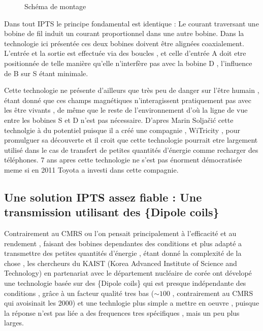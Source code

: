 \documentclass[12pt]{report}
\begin{document}
\begin{figure}
  \begin{center}
    \setlength\fboxsep{0pt}
    \setlength\fboxrule{0.5pt}
  \end{center}
  \caption{Schéma de montage}
\end{figure} Dans tout IPTS le principe fondamental est identique : Le courant traversant une bobine de fil induit un courant proportionnel dans une autre bobine. Dans la technologie ici présentée ces deux bobines doivent être alignées coaxialement. L'entrée et la sortie est effectuée via des boucles , et celle d'entrée A doit etre positionnée de telle manière qu'elle n'interfère pas avec la bobine D , l'influence de B sur S étant minimale.

  Cette technologie ne présente d'ailleurs que très peu de danger \cite{wiki1} sur l'être humain , étant donné que ces champs magnétiques n'interagissent pratiquement pas avec les être vivants , de même que le reste de l'environnement d'où la ligne de vue entre les bobines S et D n'est pas nécessaire.
 D'apres Marin Soljačić cette technolgie à du potentiel puisque il a créé une compagnie , WiTricity , pour promulguer sa découverte et il croit que cette technologie pourrait etre largement utilisé dans le cas de transfert de petites quantités d'énergie comme recharger des téléphones. 7 ans apres cette technologie ne s'est pas énorment démocratisée meme si en 2011 Toyota a investi dans cette compagnie.
\subsection{Une solution IPTS assez fiable : Une transmission utilisant des \{Dipole coils\}\cite{kaist14}}
Contrairement au CMRS ou l'on pensait principalement à l'efficacité et au rendement , faisant des bobines dependantes des conditions et plus adapté a transmettre des petites quantités d'énergie , étant donné la complexité de la chose , les chercheurs du KAIST (Korea Advanced Institute of Science and Technology) en partenariat avec le département nucléaire de corée ont dévelopé une technologie basée sur des \{Dipole coils\} qui est presque indépendante des conditions , grâce à un facteur qualité tres bas (\(\sim100\) , contrairement au CMRS qui avoisinait les 2000) et une technlogie plus simple a mettre en oeuvre , puisque la réponse n'est pas liée a des frequences tres spécifiques , mais un peu plus larges.
  
\end{document}
